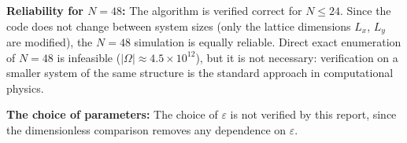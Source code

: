 \documentclass[12pt, a4paper]{article}
\theoremstyle{plain}
\theoremstyle{definition}
\newcommand{\COH}{C_\mathrm{OH}^B}
\newcommand{\eps}{\varepsilon}
\newcommand{\kB}{k_{\mathrm{B}}}
\newcommand{\Tstar}{T^*}
\newcommand{\avgE}[1]{\langle #1 \rangle}
\begin{document}
\begin{conclusion}
\textbf{Reliability for $N=48$:}
The algorithm is verified correct for $N \leq 24$.
Since the code does not change between system sizes
(only the lattice dimensions $L_x$, $L_y$ are modified),
the $N=48$ simulation is equally reliable.
Direct exact enumeration of $N=48$ is infeasible
($|\Omega| \approx 4.5\times10^{12}$), but it is not necessary:
verification on a smaller system of the same structure is
the standard approach in computational physics.
\end{conclusion}

\begin{puzzle}
\textbf{The choice of parameters:}
The choice of $\eps$ is not verified by this report, since the dimensionless comparison removes any dependence on $\eps$.
\end{puzzle}



\end{document}
